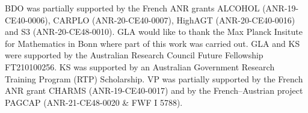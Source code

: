 \documentclass{amsart}
\theoremstyle{definition}
\begin{document}
BDO was partially supported by the French ANR grants ALCOHOL (ANR-19-CE40-0006), CARPLO (ANR-20-CE40-0007), HighAGT (ANR-20-CE40-0016) and S3 (ANR-20-CE48-0010). 
GLA would like to thank the Max Planck Insitute for Mathematics in Bonn where part of this work was carried out. 
GLA and KS were supported by the Australian Research Council Future Fellowship FT210100256. 
KS was supported by an Australian Government Research Training Program (RTP) Scholarship.
VP was partially supported by the French ANR grant CHARMS (ANR-19-CE40-0017) and by the French--Austrian project PAGCAP (ANR-21-CE48-0020 \& FWF I 5788). 






\label{sec:biblio}
\end{document}
